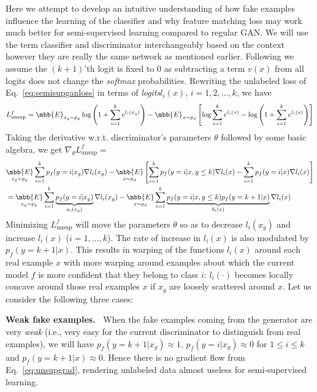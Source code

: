 \documentclass{article}
\begin{document}
Here we attempt to develop an intuitive understanding of how fake examples influence the learning of the classifier and why feature matching loss may work much better for semi-supervised learning compared to regular GAN. We will use the term classifier and discriminator interchangeably based on the context however they are really the same network as mentioned earlier. Following \cite{salimans2016improved} we assume the $(k+1)$'th logit is fixed to $0$ as subtracting a term $v(x)$ from all logits does not change the \emph{softmax} probabilities. Rewriting the unlabeled loss of Eq.~\eqref{eq:semisupganloss} in terms of \emph{logits}$l_i(x),\,i=1,2,\ldots,k$, we have
\begin{align}
L^f_\text{unsup} = \mbb{E}_{x_g\sim p_g} \log \left(1+\sum_{i=1}^k e^{l_i(x_g)}\right) - \mbb{E}_{x\sim p_d} \left[\log \sum_{i=1}^k e^{l_i(x)} - \log \left(1+\sum_{i=1}^{k} e^{l_i(x)}\right) \right] 
\end{align}
Taking the derivative w.r.t. discriminator's parameters $\theta$ followed by some basic algebra, we get $\nabla_\theta L^f_\text{unsup} =$\begin{align}
& \underset{x_g\sim p_g}{\mbb{E}} \sum_{i=1}^k p_f(y=i|x_g) \nabla l_i(x_g) - \underset{x\sim p_d}{\mbb{E}}  \left[ \sum_{i=1}^k p_f(y=i|x,y\leq k) \nabla l_i(x) -  \sum_{i=1}^k p_f(y=i|x) \nabla l_i(x) \right] \nonumber \\ 
&= \underset{x_g\sim p_g}{\mbb{E}} \sum_{i=1}^k \underbrace{p_f(y=i|x_g)}_{a_i(x_g)} \nabla l_i(x_g) - \underset{x\sim p_d}{\mbb{E}} \sum_{i=1}^k \underbrace{p_f(y=i|x,y\leq k) p_f(y=k+1|x)}_{b_i(x)}\nabla l_i(x) 
\label{eq:unsupgrad}
\end{align}
Minimizing $L^f_\text{unsup}$ will move the parameters $\theta$ so as to decrease $l_i(x_g)$ and increase $l_i(x)$ ($i=1,\ldots,k$). The rate of increase in $l_i(x)$ is also modulated by $p_f(y=k+1|x)$. This results in warping of the functions $l_i(x)$ around each real example $x$ with more warping around examples about which the current model $f$ is more confident that they belong to class $i$: $l_i(\cdot)$ becomes locally concave around those real examples $x$ if $x_g$ are loosely scattered around $x$. Let us consider the following three cases: 

{\bf Weak fake examples.~} When the fake examples coming from the generator are very \emph{weak} (i.e., very easy for the current discriminator to distinguish from real examples), we will have $p_f(y=k+1|x_g)\approx 1$, $p_f(y=i|x_g)\approx 0$ for $1\leq i\leq k$ and $p_f(y=k+1|x)\approx 0$. Hence there is no gradient flow from Eq.~\eqref{eq:unsupgrad}, rendering unlabeled data almost useless for semi-supervised learning. 
\end{document}
